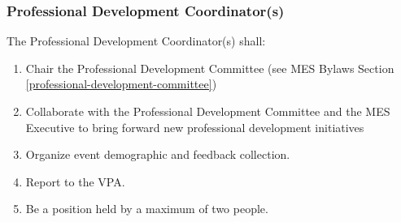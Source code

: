 
\subsubsection{Professional Development Coordinator(s)}
\label{professional-development-coordinators}
The Professional Development Coordinator(s) shall:

\begin{enumerate}
 \item
  Chair the Professional Development Committee (see MES Bylaws Section \ref{professional-development-committee})
 \item
  Collaborate with the Professional Development Committee and the MES Executive to bring forward new professional development initiatives
 \item
  Organize event demographic and feedback collection.
 \item
  Report to the VPA.
 \item
  Be a position held by a maximum of two people.

\end{enumerate}